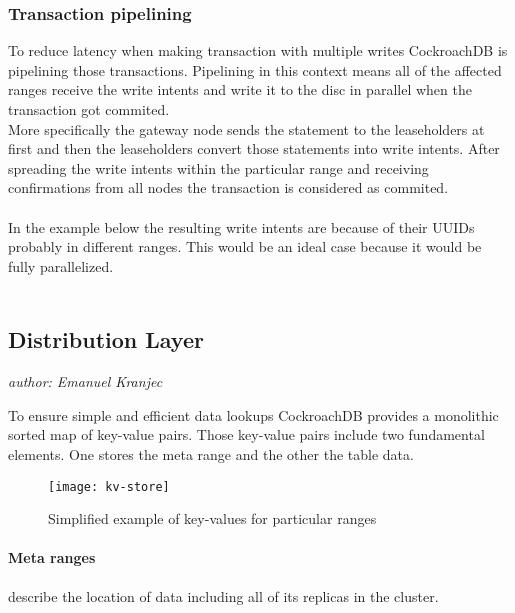 \subsubsection{Transaction pipelining}
To reduce latency when making transaction with multiple writes CockroachDB is pipelining those transactions. Pipelining in this
context means all of the affected ranges receive the write intents and write it to the disc in parallel when the transaction got
commited. \\More specifically the gateway node sends the statement to the leaseholders at first and then the leaseholders convert
those statements into write intents. After spreading the write intents within the particular range and receiving confirmations
from all nodes the transaction is considered as commited.\\\\
In the example below the resulting write intents are because of their UUIDs probably in different ranges. This would be an ideal
case because it would be fully parallelized.\\\\

\newpage
\subsection{Distribution Layer}
\emph{author: Emanuel Kranjec}\bigskip

To ensure simple and efficient data lookups CockroachDB provides a monolithic sorted map of key-value pairs. Those key-value
pairs include two fundamental elements. One stores the meta range and the other the table data.

\begin{figure}[H]
    \texttt{[image: kv-store]}
    \caption{Simplified example of key-values for particular ranges\cite{cockroach-youtube-architecture}}
    \label{fig:kv-store}
\end{figure}

\paragraph{Meta ranges}
describe the location of data including all of its replicas in the cluster.

